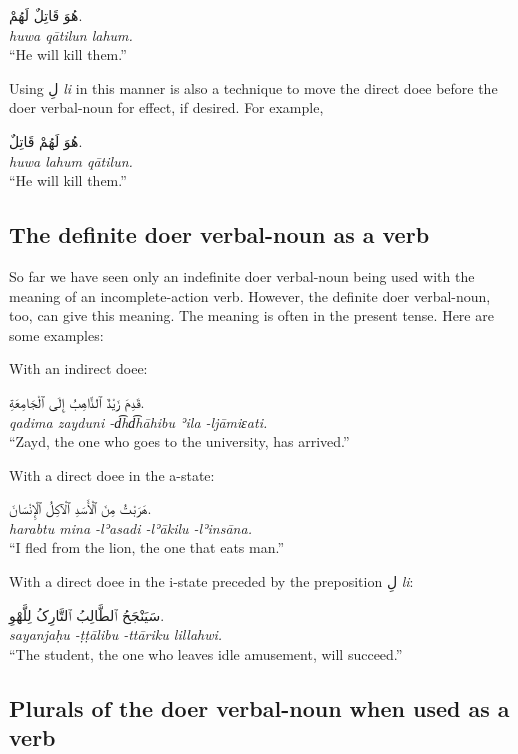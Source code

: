 \documentclass[
  10pt,
]{book}
\begin{document}
\begin{enumerate}
  \foreignlanguage{arabic}{هُوَ قَاتِلٌ لَهُمْ.}\\
  \emph{huwa qātilun lahum.}\\
  \enquote{He will kill them.}

  Using \foreignlanguage{arabic}{لِ} \emph{li} in this manner is also a technique to move the direct doee before the doer verbal-noun for effect, if desired. For example,

  \foreignlanguage{arabic}{هُوَ لَهُمْ قَاتِلٌ.}\\
  \emph{huwa lahum qātilun.}\\
  \enquote{He will kill them.}
\end{enumerate}

\subsection{The definite doer verbal-noun as a verb}\label{the-definite-doer-verbal-noun-as-a-verb}

So far we have seen only an indefinite doer verbal-noun being used with the meaning of an incomplete-action verb. However, the definite doer verbal-noun, too, can give this meaning. The meaning is often in the present tense. Here are some examples:

With an indirect doee:

\foreignlanguage{arabic}{قَدِمَ زَيْدٌ ٱلذَّاهِبُ إِلَى ٱلْجَامِعَةِ.}\\
\emph{qadima zayduni -d͡hd͡hāhibu ʾila -ljāmiɛati.}\\
\enquote{Zayd, the one who goes to the university, has arrived.}

With a direct doee in the a-state:

\foreignlanguage{arabic}{هَرَبْتُ مِنَ ٱلْأَسَدِ ٱلْآکِلُ ٱلْإِنْسَانَ.}\\
\emph{harabtu mina -lʾasadi -lʾākilu -lʾinsāna.}\\
\enquote{I fled from the lion, the one that eats man.}

With a direct doee in the i-state preceded by the preposition \foreignlanguage{arabic}{لِ} \emph{li}:

\foreignlanguage{arabic}{سَيَنْجَحُ ٱلطَّالِبُ ٱلتَّارِکُ لِلَّهْوِ.}\\
\emph{sayanjaḥu -ṭṭālibu -ttāriku lillahwi.}\\
\enquote{The student, the one who leaves idle amusement, will succeed.}

\subsection{Plurals of the doer verbal-noun when used as a verb}\label{plurals-of-the-doer-verbal-noun-when-used-as-a-verb}
\end{document}
